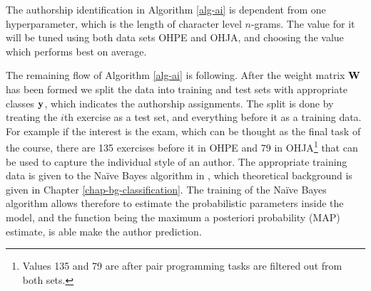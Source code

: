 \noindent
The authorship identification in Algorithm \ref{alg-ai} is dependent from one hyperparameter, which is the length of character level $n$-grams. The value for it will be tuned using both data sets OHPE and OHJA, and choosing the value which performs best on average. 

The remaining flow of Algorithm \ref{alg-ai} is following. After the weight matrix $\mathbf{W}$ has been formed we split the data into training and test sets with appropriate classes $\mathbf{y}$, which indicates the authorship assignments. The split is done by treating the $i$th exercise as a test set, and everything before it as a training data. For example if the interest is the exam, which can be thought as the final task of the course, there are 135 exercises before it in OHPE and 79 in OHJA\footnote{Values 135 and 79 are after pair programming tasks are filtered out from both sets.} that can be used to capture the individual style of an author. The appropriate training data is given to the Naïve Bayes algorithm in , which theoretical background is given in Chapter \ref{chap-bg-classification}. The training of the Naïve Bayes algorithm allows therefore to estimate the probabilistic parameters inside the model, and the function  being the maximum a posteriori probability (MAP) estimate, is able make the author prediction.




